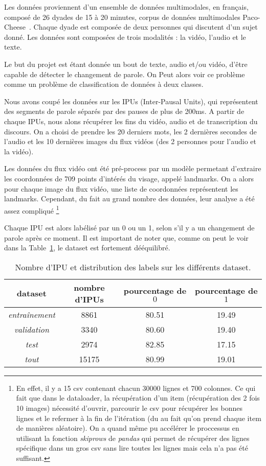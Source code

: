 Les données proviennent d'un ensemble de données multimodales, en français, composé de 26 dyades de 15 à 20 minutes, 
corpus de données multimodales Paco-Cheese~\cite{paperswithcode-paco}.
Chaque dyade est composée de deux personnes qui discutent d'un sujet donné. Les données sont composées de trois modalités : la vidéo,
l'audio et le texte.

Le but du projet est étant donnée un bout de texte, audio et/ou vidéo, d'être capable de détecter le changement de parole.
On Peut alors voir ce problème comme un problème de classification de données à deux classes.

Nous avons coupé les données sur les IPUs (Inter-Pausal Units), qui représentent des segments de parole séparés par des pauses
de plus de 200ms. A partir de chaque IPUs, nous alons récupérer les fins du vidéo, audio et de transcription du discours.
On a choisi de prendre les 20 derniers mots, les 2 dernières secondes de l'audio et les 10 dernières images du flux vidéos
(des 2 personnes pour l'audio et la vidéo).

Les données du flux vidéo ont été pré-process par un modèle permetant d'extraire les coordonnées de 709 points d'intérés du 
visage, appelé landmarks. On a alors pour chaque image du flux vidéo, une liste de coordonnées représentent les landmarks. Cependant, 
du fait au grand nombre des données, leur analyse a été assez compliqué
\footnote{En effet, il y a 15 csv contenant chacun 30000 lignes et 700 colonnes. Ce qui fait que dans le dataloader, 
la récupération d'un item (récupération des 2 fois 10 images) nécessité d'ouvrir, parcourir le csv pour récupérer les bonnes lignes et
le refermer à la fin de l'itération (du au fait qu'on prend chaque item de manières aléatoire). On a quand même pu accélérer le proccessus
en utilisant la fonction \textit{skiprows} de \textit{pandas} qui permet de récupérer des lignes spécifique dans un gros csv sans lire 
toutes les lignes mais cela n'a pas été suffisant.}

Chaque IPU est alors labélisé par un 0 ou un 1, selon s'il y a un changement de parole après ce moment. Il est important de noter que, 
comme on peut le voir dans la Table~\ref{tab: label distribution}, le dataset est fortement dééquilibré.

\begin{table}[H]
    \centering
    \begin{tabular}{|c|c|c|c|}
        \hline
        dataset & nombre d'IPUs & pourcentage de $0$ & pourcentage de $1$ \\
        \hline
        \textit{entraînement} & 8861 & 80.51 & 19.49\\
        \hline
        \textit{validation} & 3340 & 80.60 & 19.40\\
        \hline
        \textit{test} & 2974 & 82.85 & 17.15\\
        \hline
        \textit{tout} & 15175 & 80.99 & 19.01 \\
        \hline
    \end{tabular}
    \caption{Nombre d'IPU et distribution des labels sur les différents dataset.}
    \label{tab: label distribution}
\end{table}